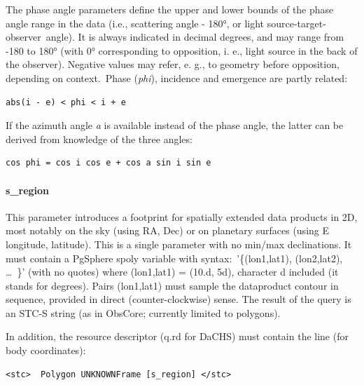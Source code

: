 \documentclass[11pt,a4paper]{ivoa}
\begin{document}
The phase angle parameters define the upper and lower bounds of the phase angle range in the data (i.e., scattering angle - 180°, or light source-target-observer angle). It is always indicated in decimal degrees, and may range from -180 to 180° (with 0° corresponding to opposition, i. e., light source in the back of the observer). Negative values may refer, e. g., to geometry before opposition, depending on context. Phase (\emph{phi}), incidence and emergence are partly related:






\begin{verbatim}
abs(i - e) < phi < i + e
\end{verbatim}




If the azimuth angle \emph{a} is available instead of the phase angle, the latter can be derived from knowledge of the three angles:






\begin{verbatim}
cos phi = cos i cos e + cos a sin i sin e
\end{verbatim}




\paragraph{s\_region}

This parameter introduces a footprint for spatially extended data products in 2D, most notably on the sky (using RA, Dec) or on planetary surfaces (using E longitude, latitude). This is a single parameter with no min/max declinations. It must contain a PgSphere spoly variable with syntax: '\{(lon1,lat1), (lon2,lat2), … \}' (with no quotes) where (lon1,lat1) = (10.d, 5d), character d included (it stands for degrees). Pairs (lon1,lat1) must sample the dataproduct contour in sequence, provided in direct (counter-clockwise) sense. The result of the query is an STC-S string (as in ObsCore; currently limited to polygons).

In addition, the resource descriptor (q.rd for DaCHS) must contain the line (for body coordinates):






\begin{verbatim}
<stc>  Polygon UNKNOWNFrame [s_region] </stc>
\end{verbatim}
\end{document}
